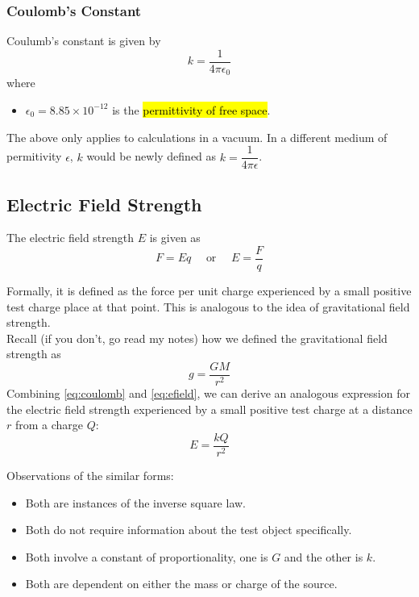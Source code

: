 \documentclass[a4paper,12pt]{article}
\newcommand{\lb}{\\[8pt]}
\begin{document}
\subsubsection{Coulomb's Constant}

Coulumb's constant is given by
\begin{equation}\label{eq:coulombconstant}
  k = \frac{1}{4\pi\epsilon_0}
\end{equation}
where
\begin{itemize}
  \item $\epsilon_0 = 8.85 \times 10^{-12}$ is the \hl{permittivity of free space}.
\end{itemize}
The above only applies to calculations in a vacuum. In a different medium of permitivity $\epsilon$, $k$ would be newly defined as $k = \dfrac{1}{4\pi\epsilon}$.

\pagebreak

\subsection{Electric Field Strength}

The electric field strength $E$ is given as
\begin{equation}\label{eq:efield}
  F = Eq \quad \text{ or } \quad E = \frac{F}{q}
\end{equation}

Formally, it is defined as the force per unit charge experienced by a small positive test charge place at that point. This is analogous to the idea of gravitational field strength.\lb
Recall (if you don't, go read my notes) how we defined the gravitational field strength as
$$g = \frac{GM}{r^2}$$
Combining \cref{eq:coulomb} and \cref{eq:efield}, we can derive an analogous expression for the electric field strength experienced by a small positive test charge at a distance $r$ from a charge $Q$:
\begin{equation}\label{eq:efield2}
  E = \frac{kQ}{r^2}
\end{equation}

Observations of the similar forms:
\begin{itemize}
  \item Both are instances of the inverse square law.
  \item Both do not require information about the test object specifically.
  \item Both involve a constant of proportionality, one is $G$ and the other is $k$.
  \item Both are dependent on either the mass or charge of the source.
\end{itemize}
\end{document}
